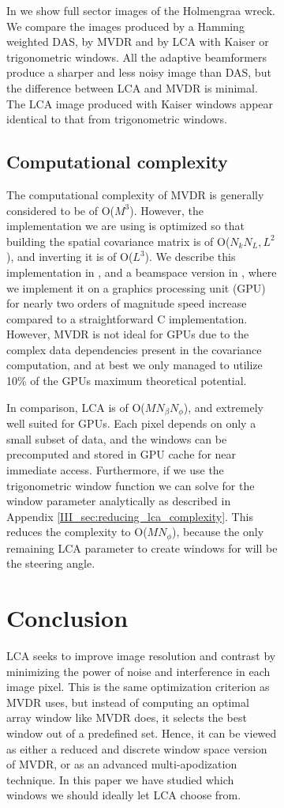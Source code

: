\begin{figure}[tbp]
\begin{figure}[tbp]
\begin{figure*}[t]
\begin{figure*}[tbp]
\begin{figure*}[tb]
In  we show full sector images of the Holmengraa wreck. We compare the images produced by a Hamming weighted DAS, by MVDR and by LCA with Kaiser or trigonometric windows. All the adaptive beamformers produce a sharper and less noisy image than DAS, but the difference between LCA and MVDR is minimal. The LCA image produced with Kaiser windows appear identical to that from trigonometric windows.


\subsection{Computational complexity}\label{III_sec:results_complexity}

The computational complexity of MVDR is generally considered to be of O($M^3$). However, the implementation we are using is optimized so that building the spatial covariance matrix is of O($N_kN_L,L^2$), and inverting it is of O($L^3$). We describe this implementation in \cite{Buskenes2014}, and a beamspace version in \cite{Asen2013}, where we implement it on a graphics processing unit (GPU) for nearly two orders of magnitude speed increase compared to a straightforward C implementation. However, MVDR is not ideal for GPUs due to the complex data dependencies present in the covariance computation, and at best we only managed to utilize 10\% of the GPUs maximum theoretical potential.

In comparison, LCA is of O($M N_\beta N_\phi$), and extremely well suited for GPUs. Each pixel depends on only a small subset of data, and the windows can be precomputed and stored in GPU cache for near immediate access. Furthermore, if we use the trigonometric window function we can solve for the window parameter analytically as described in Appendix \ref{III_sec:reducing_lca_complexity}. This reduces the complexity to O($M N_\phi$), because the only remaining LCA parameter to create windows for will be the steering angle.



\section{Conclusion}\label{III_sec:conclusion}


LCA seeks to improve image resolution and contrast by minimizing the power of noise and interference in each image pixel. This is the same optimization criterion as MVDR uses, but instead of computing an optimal array window like MVDR does, it selects the best window out of a predefined set. Hence, it can be viewed as either a reduced and discrete window space version of MVDR, or as an advanced multi-apodization technique. In this paper we have studied which windows we should ideally let LCA choose from.


\end{figure*}
\end{figure*}
\end{figure*}
\end{figure}
\end{figure}
